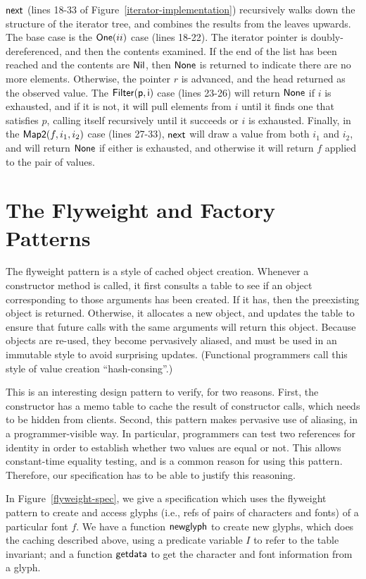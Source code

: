 $\mathsf{next}$ (lines 18-33 of Figure~\ref{iterator-implementation})
recursively walks down the structure of the iterator tree, and
combines the results from the leaves upwards.  The base case is the
$\mathsf{One}(ii)$ case (lines 18-22). The iterator pointer is
doubly-dereferenced, and then the contents examined. If the end of the
list has been reached and the contents are $\mathsf{Nil}$, then $\mathsf{None}$ is
returned to indicate there are no more elements. Otherwise, the
pointer $r$ is advanced, and the head returned as the observed
value. The $\mathsf{Filter(p,i)}$ case (lines 23-26) will return
$\mathsf{None}$ if $i$ is exhausted, and if it is not, it will pull elements
from $i$ until it finds one that satisfies $p$, calling itself
recursively until it succeeds or $i$ is exhausted.  Finally, in the
$\mathsf{Map2}(f, i_1, i_2)$ case (lines 27-33), $\mathsf{next}$ will draw
a value from both $i_1$ and $i_2$, and will return $\mathsf{None}$ if either
is exhausted, and otherwise it will return $f$ applied to the pair of
values.


\section{The Flyweight and Factory Patterns}

The flyweight pattern is a style of cached object creation. Whenever a
constructor method is called, it first consults a table to see if an
object corresponding to those arguments has been created. If it has,
then the preexisting object is returned.  Otherwise, it allocates a
new object, and updates the table to ensure that future calls with the
same arguments will return this object. Because objects are re-used,
they become pervasively aliased, and must be used in an immutable
style to avoid surprising updates. (Functional programmers call this
style of value creation ``hash-consing''.)

This is an interesting design pattern to verify, for two reasons.
First, the constructor has a memo table to cache the result of
constructor calls, which needs to be hidden from clients. Second, this
pattern makes pervasive use of aliasing, in a programmer-visible
way. In particular, programmers can test two references for identity
in order to establish whether two values are equal or not. This allows
constant-time equality testing, and is a common reason for using this
pattern. Therefore, our specification has to be able to justify this
reasoning.

In Figure~\ref{flyweight-spec}, we give a specification which uses the
flyweight pattern to create and access glyphs (i.e., refs of pairs of
characters and fonts) of a particular font $f$. We have a function
$\mathsf{newglyph}$ to create new glyphs, which does the caching
described above, using a predicate variable $I$ to refer to the table
invariant; and a function $\mathsf{getdata}$ to get the character and
font information from a glyph.

